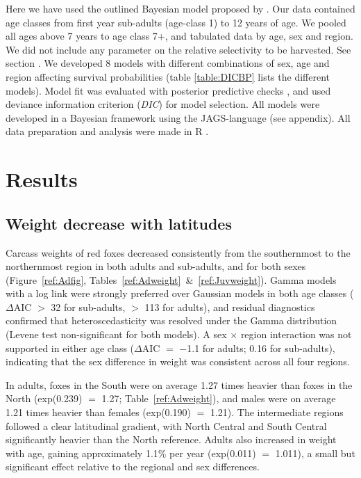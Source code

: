 \documentclass[12pt,a4paper,final,abstract=true,headings=small]{scrartcl}
\begin{document}
Here we have used the outlined Bayesian model proposed by \citet{skellyFlexibleBayesianApproach}. Our data contained age classes from first year sub-adults (age-class 1) to 12 years of age. We pooled all ages above 7 years to age class 7+, and tabulated data by age, sex and region. We did not include any parameter on the relative selectivity to be harvested. See section . We developed 8 models  with different combinations of sex, age and region affecting survival probabilities (table \ref{table:DICBP} lists the different models). Model fit was evaluated with posterior predictive checks \citep{keryIntroductionWinBUGSEcologists2010}, and used deviance information criterion (\emph{DIC}) for model selection. All models were developed in a Bayesian framework using the JAGS-language \citep{plummerJAGSProgramAnalysis2003b} (see appendix). All data preparation and analysis were made in R \citep{rcoreteamLanguageEnvironmentStatistical2024b}.

\section*{Results}

\subsection*{Weight decrease with latitudes}

Carcass weights of red foxes decreased consistently from the southernmost to the northernmost region in both adults and sub-adults, and for both sexes (Figure~\ref{ref:Adfig}, Tables~\ref{ref:Adweight}~\&~\ref{ref:Juvweight}). Gamma models with a log link were strongly preferred over Gaussian models in both age classes ($\Delta$AIC $>$ 32 for sub-adults, $>$ 113 for adults), and residual diagnostics confirmed that heteroscedasticity was resolved under the Gamma distribution (Levene test non-significant for both models). A sex $\times$ region interaction was not supported in either age class ($\Delta$AIC $=$ $-$1.1 for adults; 0.16 for sub-adults), indicating that the sex difference in weight was consistent across all four regions.

In adults, foxes in the South were on average 1.27 times heavier than foxes in the North (exp(0.239) $=$ 1.27; Table~\ref{ref:Adweight}), and males were on average 1.21 times heavier than females (exp(0.190) $=$ 1.21). The intermediate regions followed a clear latitudinal gradient, with North Central and South Central significantly heavier than the North reference. Adults also increased in weight with age, gaining approximately 1.1\% per year (exp(0.011) $=$ 1.011), a small but significant effect relative to the regional and sex differences.
\end{document}
